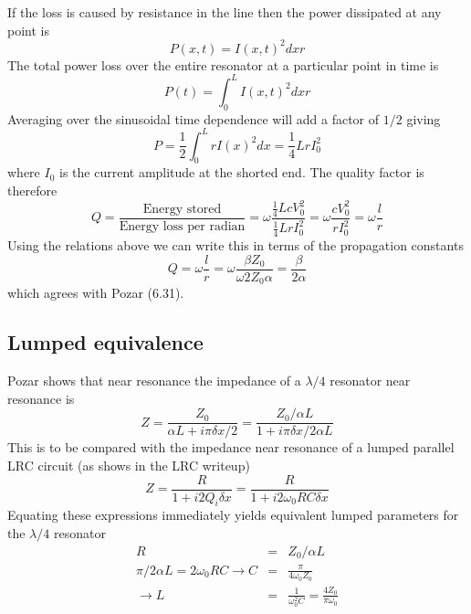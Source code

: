 \documentclass{article}
\begin{document}
If the loss is caused by resistance in the line then the power dissipated at any point is \begin{equation}
P(x,t) = I(x,t)^2 dx r \end{equation}
The total power loss over the entire resonator at a particular point in time is \begin{equation}
P(t) = \int_0^L I(x,t)^2 dx r \end{equation}
Averaging over the sinusoidal time dependence will add a factor of $1/2$ giving \begin{equation}
P = \frac{1}{2} \int_0^L r I(x)^2 dx = \frac{1}{4} L r I_0^2 \end{equation}
where $I_0$ is the current amplitude at the shorted end. The quality factor is therefore \begin{equation}
Q = \frac{\textrm{Energy stored}}{\textrm{Energy loss per radian}} = \omega \frac{\frac{1}{4}LcV_0^2} {\frac{1}{4}LrI_0^2}=\omega \frac{cV_0^2}{rI_0^2} = \omega \frac{l}{r}\end{equation}
Using the relations above we can write this in terms of the propagation constants \begin{equation}
Q = \omega \frac{l}{r} = \omega \frac{\beta Z_0}{\omega 2 Z_0 \alpha} = \frac{\beta}{2\alpha} \end{equation}
which agrees with Pozar (6.31).

\subsection{Lumped equivalence}

Pozar shows that near resonance the impedance of a $\lambda/4$ resonator near resonance is \begin{equation}
Z = \frac{Z_0} {\alpha L + i\pi \delta x /2} =\frac{Z_0/\alpha L}{1+i\pi \delta x/ 2 \alpha L} \label{eq:lambda4Impedance} \end{equation}
This is to be compared with the impedance near resonance of a lumped parallel LRC circuit (as shows in the LRC writeup) \begin{equation}
Z = \frac{R}{1 + i2Q_i \delta x} = \frac{R}{1 +i2\omega_0 R C \delta x} \end{equation}
Equating these expressions immediately yields equivalent lumped parameters for the $\lambda/4$ resonator \begin{eqnarray}
R &=& Z_0/\alpha L \\
\pi/2\alpha L = 2 \omega_0 R C \rightarrow C &=& \frac{\pi}{4 \omega_0 Z_0} \\
\rightarrow L &=& \frac{1}{\omega_0^2 C} = \frac{4 Z_0}{\pi \omega_0}\end{eqnarray}
\end{document}

